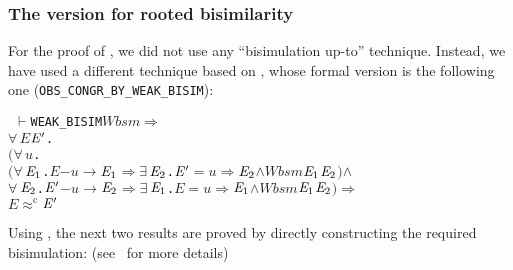 \documentclass[GCNS]{yincog}
\renewcommand{\HOLConst}[1]{\texttt{#1}}
\renewcommand{\HOLBoundVar}[1]{\ensuremath{\mathit{#1}}}
\renewcommand{\HOLFreeVar}[1]{\ensuremath{\mathit{#1}}}
\renewcommand{\HOLSymConst}[1]{#1}
\renewcommand{\HOLTokenConj}{\ensuremath{\wedge}}
\renewcommand{\HOLTokenExists}{\ensuremath{\exists \,}}
\renewcommand{\HOLTokenForall}{\ensuremath{\forall \,}}
\renewcommand{\HOLTokenTurnstile}{\ensuremath{\:\:\vdash}}
\theoremstyle{remark}
\theoremstyle{theorem}
\theoremstyle{remark}
\newcommand{\HOLTokenObsCongr}{$\approx^{\mathrm{c}}\!$}
\newcommand{\HOLTokenTransBegin}{$-$}
\newcommand{\HOLTokenTransEnd}{$\rightarrow$\xspace}
\newcommand{\HOLTokenWeakTransBegin}{$=$}
\newcommand{\HOLTokenWeakTransEnd}{$\Rightarrow$\xspace}
\renewcommand{\HOLTokenImp}{\ensuremath{\Longrightarrow}}
\begin{document}
\subsubsection{The version for rooted bisimilarity}
 \label{sec4.10.2}

For the proof of , we did not use any ``bisimulation
up-to'' technique. Instead, we have used a different technique based on
, whose formal version is the following
one (\texttt{OBS\_CONGR\_BY\_WEAK\_BISIM}):
%
\begin{alltt}
\HOLTokenTurnstile{} \HOLConst{WEAK\_BISIM} \HOLFreeVar{Wbsm} \HOLSymConst{\HOLTokenImp{}}
   \HOLSymConst{\HOLTokenForall{}}\HOLBoundVar{E} \ensuremath{\HOLBoundVar{E}\sp{\prime}}.
       \ensuremath{(}\HOLSymConst{\HOLTokenForall{}}\HOLBoundVar{u}.
            \ensuremath{(}\HOLSymConst{\HOLTokenForall{}}\ensuremath{\HOLBoundVar{E}\sb{\mathrm{1}}}. \HOLBoundVar{E} \HOLTokenTransBegin\HOLBoundVar{u}\HOLTokenTransEnd \ensuremath{\HOLBoundVar{E}\sb{\mathrm{1}}} \HOLSymConst{\HOLTokenImp{}} \HOLSymConst{\HOLTokenExists{}}\ensuremath{\HOLBoundVar{E}\sb{\mathrm{2}}}. \ensuremath{\HOLBoundVar{E}\sp{\prime}} \HOLTokenWeakTransBegin\HOLBoundVar{u}\HOLTokenWeakTransEnd \ensuremath{\HOLBoundVar{E}\sb{\mathrm{2}}} \HOLSymConst{\HOLTokenConj{}} \HOLFreeVar{Wbsm} \ensuremath{\HOLBoundVar{E}\sb{\mathrm{1}}} \ensuremath{\HOLBoundVar{E}\sb{\mathrm{2}}}\ensuremath{)} \HOLSymConst{\HOLTokenConj{}}
            \HOLSymConst{\HOLTokenForall{}}\ensuremath{\HOLBoundVar{E}\sb{\mathrm{2}}}. \ensuremath{\HOLBoundVar{E}\sp{\prime}} \HOLTokenTransBegin\HOLBoundVar{u}\HOLTokenTransEnd \ensuremath{\HOLBoundVar{E}\sb{\mathrm{2}}} \HOLSymConst{\HOLTokenImp{}} \HOLSymConst{\HOLTokenExists{}}\ensuremath{\HOLBoundVar{E}\sb{\mathrm{1}}}. \HOLBoundVar{E} \HOLTokenWeakTransBegin\HOLBoundVar{u}\HOLTokenWeakTransEnd \ensuremath{\HOLBoundVar{E}\sb{\mathrm{1}}} \HOLSymConst{\HOLTokenConj{}} \HOLFreeVar{Wbsm} \ensuremath{\HOLBoundVar{E}\sb{\mathrm{1}}} \ensuremath{\HOLBoundVar{E}\sb{\mathrm{2}}}\ensuremath{)} \HOLSymConst{\HOLTokenImp{}}
       \HOLBoundVar{E} \HOLSymConst{\HOLTokenObsCongr} \ensuremath{\HOLBoundVar{E}\sp{\prime}}
\end{alltt}
%
Using , the next two results are proved
by directly constructing the required bisimulation: (see~\cite{Tian:2017wrba}
for more details)
%
\end{document}

